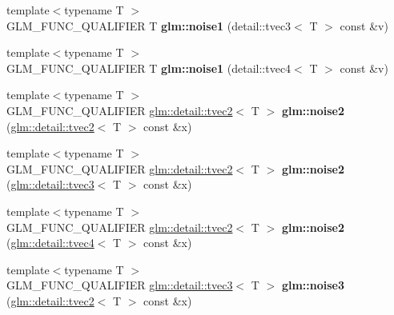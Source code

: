 \begin{DoxyCompactItemize}
\item 
\hypertarget{namespaceglm_a6d0c178ef88d9dbdba8c16d733c2f2a9}{}{\footnotesize template$<$typename T $>$ }\\G\+L\+M\+\_\+\+F\+U\+N\+C\+\_\+\+Q\+U\+A\+L\+I\+F\+I\+E\+R T {\bfseries glm\+::noise1} (detail\+::tvec3$<$ T $>$ const \&v)\label{namespaceglm_a6d0c178ef88d9dbdba8c16d733c2f2a9}

\item 
\hypertarget{namespaceglm_a2266131ab15c73090fd07186ad8bccf4}{}{\footnotesize template$<$typename T $>$ }\\G\+L\+M\+\_\+\+F\+U\+N\+C\+\_\+\+Q\+U\+A\+L\+I\+F\+I\+E\+R T {\bfseries glm\+::noise1} (detail\+::tvec4$<$ T $>$ const \&v)\label{namespaceglm_a2266131ab15c73090fd07186ad8bccf4}

\item 
\hypertarget{namespaceglm_a613ad9c9a0caaca594321e107ffe7b54}{}{\footnotesize template$<$typename T $>$ }\\G\+L\+M\+\_\+\+F\+U\+N\+C\+\_\+\+Q\+U\+A\+L\+I\+F\+I\+E\+R \hyperlink{structglm_1_1detail_1_1tvec2}{glm\+::detail\+::tvec2}$<$ T $>$ {\bfseries glm\+::noise2} (\hyperlink{structglm_1_1detail_1_1tvec2}{glm\+::detail\+::tvec2}$<$ T $>$ const \&x)\label{namespaceglm_a613ad9c9a0caaca594321e107ffe7b54}

\item 
\hypertarget{namespaceglm_a1c398318263d9bd2ae0f5cf12aaa1b28}{}{\footnotesize template$<$typename T $>$ }\\G\+L\+M\+\_\+\+F\+U\+N\+C\+\_\+\+Q\+U\+A\+L\+I\+F\+I\+E\+R \hyperlink{structglm_1_1detail_1_1tvec2}{glm\+::detail\+::tvec2}$<$ T $>$ {\bfseries glm\+::noise2} (\hyperlink{structglm_1_1detail_1_1tvec3}{glm\+::detail\+::tvec3}$<$ T $>$ const \&x)\label{namespaceglm_a1c398318263d9bd2ae0f5cf12aaa1b28}

\item 
\hypertarget{namespaceglm_a1a6474cddee1470476771ba4e087b9e1}{}{\footnotesize template$<$typename T $>$ }\\G\+L\+M\+\_\+\+F\+U\+N\+C\+\_\+\+Q\+U\+A\+L\+I\+F\+I\+E\+R \hyperlink{structglm_1_1detail_1_1tvec2}{glm\+::detail\+::tvec2}$<$ T $>$ {\bfseries glm\+::noise2} (\hyperlink{structglm_1_1detail_1_1tvec4}{glm\+::detail\+::tvec4}$<$ T $>$ const \&x)\label{namespaceglm_a1a6474cddee1470476771ba4e087b9e1}

\item 
\hypertarget{namespaceglm_ae13deb2380745fdaed257f28f0a0833d}{}{\footnotesize template$<$typename T $>$ }\\G\+L\+M\+\_\+\+F\+U\+N\+C\+\_\+\+Q\+U\+A\+L\+I\+F\+I\+E\+R \hyperlink{structglm_1_1detail_1_1tvec3}{glm\+::detail\+::tvec3}$<$ T $>$ {\bfseries glm\+::noise3} (\hyperlink{structglm_1_1detail_1_1tvec2}{glm\+::detail\+::tvec2}$<$ T $>$ const \&x)\label{namespaceglm_ae13deb2380745fdaed257f28f0a0833d}


\end{DoxyCompactItemize}

